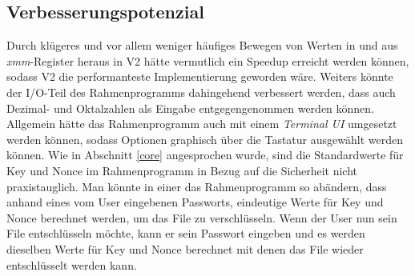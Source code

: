 \documentclass[course=erap]{aspdoc}
\begin{document}
\subsection{Verbesserungspotenzial}
Durch klügeres und vor allem weniger häufiges Bewegen von Werten in und aus \emph{xmm}-Register heraus
in V2 hätte vermutlich ein Speedup erreicht werden können, sodass V2 die performanteste Implementierung
geworden wäre.
Weiters könnte der I/O-Teil des Rahmenprogramms dahingehend verbessert werden, dass auch Dezimal- und
Oktalzahlen als Eingabe entgegengenommen werden können. Allgemein hätte das Rahmenprogramm auch mit einem 
\emph{Terminal UI} umgesetzt werden können, sodass Optionen graphisch über die Tastatur ausgewählt werden können.
Wie in Abschnitt \ref{core} angesprochen wurde, sind die Standardwerte für Key und Nonce im Rahmenprogramm 
in Bezug auf die Sicherheit nicht praxistauglich.
Man könnte in einer das Rahmenprogramm so abändern, dass anhand eines vom User eingebenen Passworts, 
eindeutige Werte für Key und Nonce berechnet werden, um das File zu verschlüsseln. Wenn der User nun 
sein File entschlüsseln möchte, kann er sein Passwort eingeben und es werden dieselben Werte für 
Key und Nonce berechnet mit denen das File wieder entschlüsselt werden kann.


{}
\end{document}
